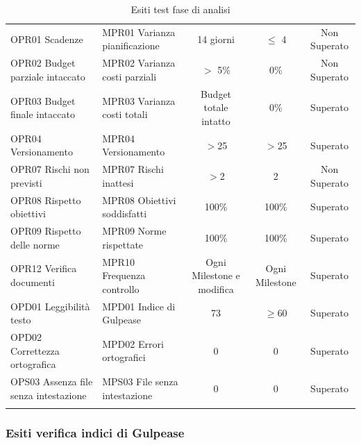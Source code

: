 \documentclass[../piano_di_qualifica.tex]{subfiles}
\begin{document}
\begin{center}
\begin{longtable}{|p{4cm}|p{4cm}|c|c|c|}
		\hline
		\rowcolor{white}
		\multicolumn{5}{|c|}{\emph{Continua alla pagina successiva...}}                                                                           \\
		\hline
		\endfoot
		\endlastfoot
		OPR01 Scadenze                        & MPR01 Varianza pianificazione & 14 giorni                 & $\leq$ 4             & Non Superato   \\
		OPR02 Budget parziale intaccato       & MPR02 Varianza costi parziali & $>$ 5\%                   & 0\%                  & Non Superato   \\
		OPR03 Budget finale intaccato         & MPR03 Varianza costi totali   & Budget totale intatto     & 0\%                  & Superato       \\
		OPR04 Versionamento                   & MPR04 Versionamento           & $>$25                     & $>$25                & Superato       \\
		OPR07 Rischi non previsti             & MPR07 Rischi inattesi         & $>$2                      & 2                    & Non Superato   \\
		OPR08 Rispetto obiettivi              & MPR08 Obiettivi soddisfatti   & 100\%                     & 100\%                & Superato       \\
		OPR09 Rispetto delle norme            & MPR09 Norme rispettate        & 100\%                     & 100\%                & Superato       \\
		OPR12 Verifica documenti              & MPR10 Frequenza controllo     & Ogni Milestone e modifica & Ogni Milestone       & Superato       \\
		OPD01 Leggibilità testo               & MPD01 Indice di Gulpease      & 73                        & \(\ge 60\)           & Superato       \\
		OPD02 Correttezza ortografica         & MPD02 Errori ortografici      & 0                         & 0                    & Superato       \\
		OPS03 Assenza file senza intestazione & MPS03 File senza intestazione & 0                         & 0                    & Superato       \\
		\hline
		\rowcolor{white}
		\caption{Esiti test fase di analisi}
	\end{longtable}
\end{center}

\subsubsection{Esiti verifica indici di Gulpease}
\label{sub:verif_gul_RR}
\end{document}
